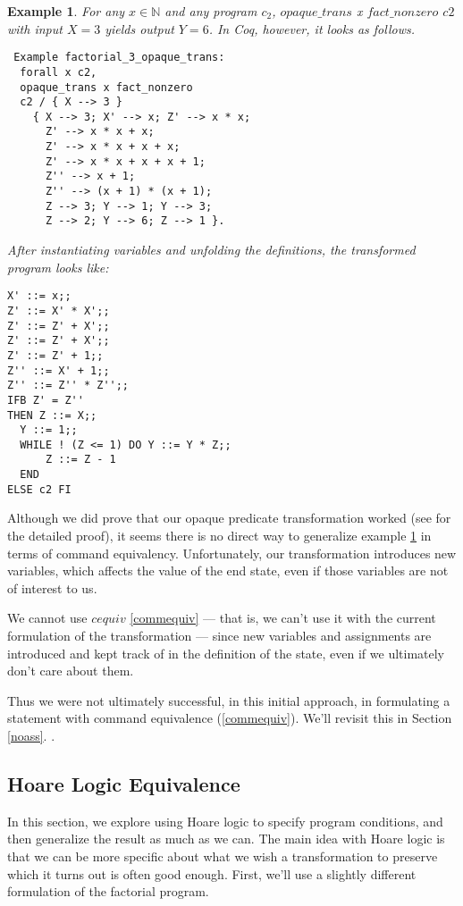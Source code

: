 \documentclass[compsoc,conference,a4paper,10pt,times]{IEEEtran}
\newtheorem{example}[theorem]{Example}
\begin{document}
\begin{example}\label{firstfact}
    For any $x\in \mathbb{N}$ and any program $c_2$, $opaque\_trans$ x $fact\_nonzero$ $c2$ with input $X=3$ yields output $Y=6$.  In Coq, however, it looks as follows.
    \begin{verbatim} Example factorial_3_opaque_trans:
  forall x c2, 
  opaque_trans x fact_nonzero 
  c2 / { X --> 3 } 
    { X --> 3; X' --> x; Z' --> x * x; 
      Z' --> x * x + x; 
      Z' --> x * x + x + x;
      Z' --> x * x + x + x + 1; 
      Z'' --> x + 1; 
      Z'' --> (x + 1) * (x + 1); 
      Z --> 3; Y --> 1; Y --> 3; 
      Z --> 2; Y --> 6; Z --> 1 }.
    \end{verbatim}
      After instantiating variables and unfolding the definitions, the transformed program looks like:
      \begin{verbatim}
X' ::= x;;
Z' ::= X' * X';;
Z' ::= Z' + X';;
Z' ::= Z' + X';;
Z' ::= Z' + 1;;
Z'' ::= X' + 1;;
Z'' ::= Z'' * Z'';;
IFB Z' = Z''
THEN Z ::= X;;
  Y ::= 1;;
  WHILE ! (Z <= 1) DO Y ::= Y * Z;; 
      Z ::= Z - 1 
  END
ELSE c2 FI
      \end{verbatim}
\end{example}

\par Although we did prove that our opaque predicate transformation worked (see \cite{WeiRepo} for the detailed proof), it seems there is no direct way to generalize example \ref{firstfact} in terms of command equivalency. Unfortunately, our transformation introduces new variables, which affects the value of the end state, even if those variables are not of interest to us. 
      
\par We cannot use $cequiv$ \eqref{commequiv} --- that is, we can't use it with the current formulation of the transformation --- since new variables and assignments are introduced and kept track of in the definition of the state, even if we ultimately don't care about them.  
\par Thus we were not ultimately successful, in this initial approach, in formulating a statement with command equivalence (\ref{commequiv}).  We'll revisit this in Section \ref{noass}.
.

\subsection{Hoare Logic Equivalence}\label{hoarequiv}

In this section, we explore using Hoare logic to specify program conditions, and then generalize the result as much as we can.  The main idea with Hoare logic is that we can be more specific about what we wish a transformation to preserve which it turns out is often good enough. %
First, we'll use a slightly different formulation of the factorial program.
\end{document}
